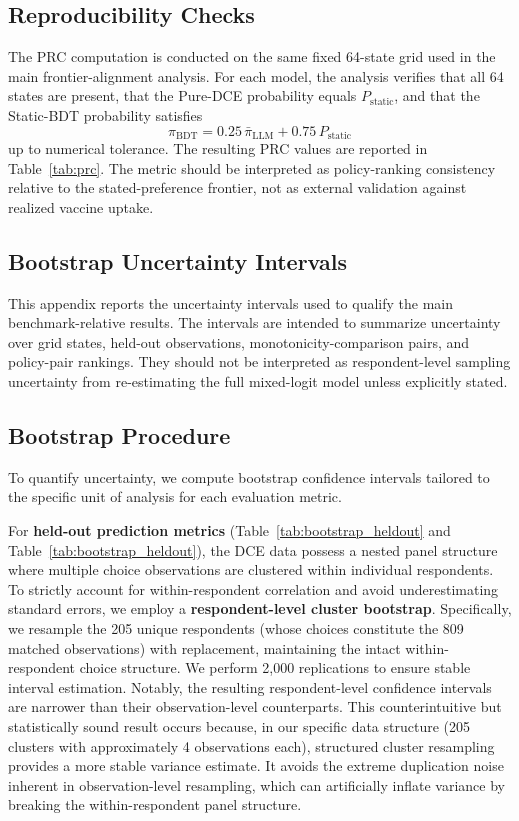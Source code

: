 \documentclass[11pt]{article}
\begin{document}
\subsection{Reproducibility Checks}

The PRC computation is conducted on the same fixed 64-state grid used in the main frontier-alignment analysis. For each model, the analysis verifies that all 64 states are present, that the Pure-DCE probability equals \(P_{\mathrm{static}}\), and that the Static-BDT probability satisfies
\[
\pi_{\mathrm{BDT}}
=
0.25\,\bar{\pi}_{\mathrm{LLM}}
+
0.75\,P_{\mathrm{static}}
\]
up to numerical tolerance. The resulting PRC values are reported in Table~\ref{tab:prc}. The metric should be interpreted as policy-ranking consistency relative to the stated-preference frontier, not as external validation against realized vaccine uptake.

\subsection{Bootstrap Uncertainty Intervals}
\label{app:bootstrap}

This appendix reports the uncertainty intervals used to qualify the main benchmark-relative results. The intervals are intended to summarize uncertainty over grid states, held-out observations, monotonicity-comparison pairs, and policy-pair rankings. They should not be interpreted as respondent-level sampling uncertainty from re-estimating the full mixed-logit model unless explicitly stated.

\subsection{Bootstrap Procedure}
\label{app:bootstrap_procedure}

To quantify uncertainty, we compute bootstrap confidence intervals tailored to the specific unit of analysis for each evaluation metric. 

For \textbf{held-out prediction metrics} (Table~\ref{tab:bootstrap_heldout} and Table~\ref{tab:bootstrap_heldout}), the DCE data possess a nested panel structure where multiple choice observations are clustered within individual respondents. To strictly account for within-respondent correlation and avoid underestimating standard errors, we employ a \textbf{respondent-level cluster bootstrap}. Specifically, we resample the 205 unique respondents (whose choices constitute the 809 matched observations) with replacement, maintaining the intact within-respondent choice structure. We perform 2,000 replications to ensure stable interval estimation. Notably, the resulting respondent-level confidence intervals are narrower than their observation-level counterparts. This counterintuitive but statistically sound result occurs because, in our specific data structure (205 clusters with approximately 4 observations each), structured cluster resampling provides a more stable variance estimate. It avoids the extreme duplication noise inherent in observation-level resampling, which can artificially inflate variance by breaking the within-respondent panel structure.
\end{document}
